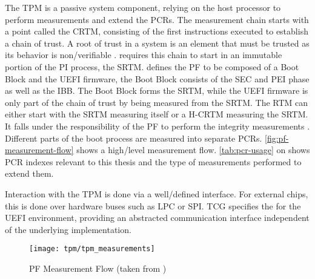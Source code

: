 The \ac{TPM} is a passive system component, relying on the host processor to perform measurements and extend the \acp{PCR}.
The measurement chain starts with a point called the \ac{CRTM}, consisting of the first instructions executed to establish a chain of trust.
A root of trust in a system is an element that must be trusted as its behavior is non\-/verifiable \cite{tcg-tpm-library-part1-architecture}.
\cite[3.2.2]{tcg-pc-client-platform-firmware-profile-spec} requires this chain to start in an immutable portion of the \ac{PI} process, the \ac{SRTM}.
\cite[3.2.3.1]{tcg-pc-client-platform-firmware-profile-spec} defines the \ac{PF} to be composed of a Boot Block and the \ac{UEFI} firmware, the Boot Block consists of the \ac{SEC} and \ac{PEI} phase as well as the \ac{IBB}.
The Boot Block forms the \ac{SRTM}, while the \ac{UEFI} firmware is only part of the chain of trust by being measured from the \ac{SRTM}.
The \ac{RTM} can either start with the \ac{SRTM} measuring itself or a \ac{H-CRTM} measuring the \ac{SRTM}.
It falls under the responsibility of the \ac{PF} to perform the integrity measurements \cite{tcg-pc-client-platform-firmware-profile-spec}.
Different parts of the boot process are measured into separate \acp{PCR}.
\autoref{fig:pf-measurement-flow} shows a high\-/level measurement flow.
\autoref{tab:pcr-usage} on \pageref{tab:pcr-usage} shows \ac{PCR} indexes relevant to this thesis and the type of measurements performed to extend them.

Interaction with the \ac{TPM} is done via a well\-/defined interface.
For external chips, this is done over hardware buses such as \ac{LPC} or \ac{SPI}.
\ac{TCG} specifies the  for the \ac{UEFI} environment, providing an abstracted communication interface independent of the underlying implementation.

\begin{figure}[htb]
    \centering
    \texttt{[image: tpm/tpm\_measurements]}
    \caption[\acs{PF} Measurement Flow]{\acs{PF} Measurement Flow (taken from \cite[Figure 3]{tianocore-trusted-boot-chain})}
    \label{fig:pf-measurement-flow}
\end{figure}

